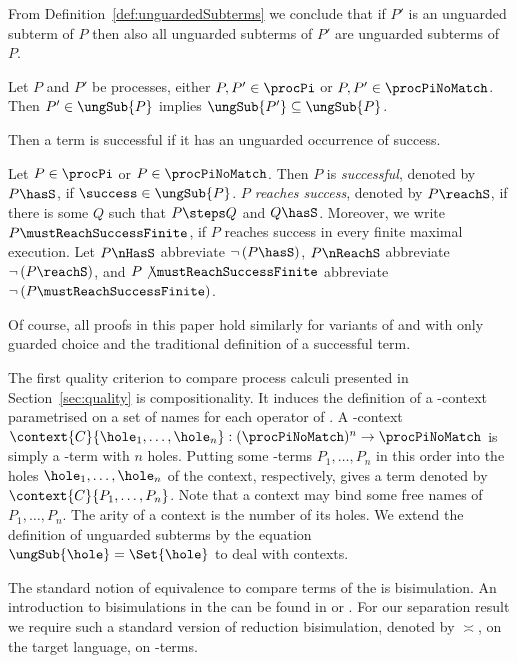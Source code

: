 \documentclass[]{article}
\begin{document}
From Definition~\ref{def:unguardedSubterms} we conclude that if $ P' $ is an unguarded subterm of $ P $ then also all unguarded subterms of $ P' $ are unguarded subterms of $ P $.

\begin{lemma}
	\label{prop:subsetUngSub}
	Let $ P $ and $ P' $ be processes, \ie either $ P, P' \in \procPi $ or $ P, P' \in \procPiNoMatch $. Then $ P' \in \ungSub{P} $ implies $ \ungSub{P'} \subseteq \ungSub{P} $.
\end{lemma}

Then a term is successful if it has an unguarded occurrence of success.

\begin{definition}
	Let $ P \in \procPi $ or $ P \in \procPiNoMatch $. Then $ P $ is \emph{successful}, denoted by $ P \hasS $, if $ \success \in \ungSub{P} $.
	\emph{$ P $ reaches success}, denoted by $ P \reachS $, if there is some $ Q $ such that $ P \steps Q $ and $ Q \hasS $.
	Moreover, we write $ P \mustReachSuccessFinite $, if $ P $ reaches success in every finite maximal execution.
Let $ P \nHasS $ abbreviate $ \neg \left( P \hasS \right) $, $ P \nReachS $ abbreviate $ \neg \left( P \reachS \right) $, and $ P \not\mustReachSuccessFinite $ abbreviate $ \neg \left( P \mustReachSuccessFinite \right) $.
\end{definition}

\noindent
Of course, all proofs in this paper hold similarly for variants of \piT and \piNM with only guarded choice and the traditional definition of a successful term.

The first quality criterion to compare process calculi presented in Section~\ref{sec:quality} is compositionality. It induces the definition of a \piNM-context parametrised on a set of names for each operator of \piT. A \piNM-context $ \context{C}{\hole_1, \ldots, \hole_n} : (\procPiNoMatch)^n \to \procPiNoMatch $ is simply a \piNM-term with $ n $ holes. Putting some \piNM-terms $ P_1, \ldots, P_n $ in this order into the holes $ \hole_1, \ldots, \hole_n $ of the context, respectively, gives a term denoted by $ \context{C}{P_1, \ldots, P_n} $. Note that a context may bind some free names of $ P_1, \ldots, P_n $. The arity of a context is the number of its holes. We extend the definition of unguarded subterms by the equation $ \ungSub{\hole} = \Set{ \hole } $ to deal with contexts.

The standard notion of equivalence to compare terms of the \piCal is bisimulation. An introduction to bisimulations in the \piCal can be found \eg in \cite{milnerParrowWalker92} or \cite{sang}. For our separation result we require such a standard version of reduction bisimulation, denoted by $ \asymp $, on the target language, \ie on \piNM-terms.
\end{document}
